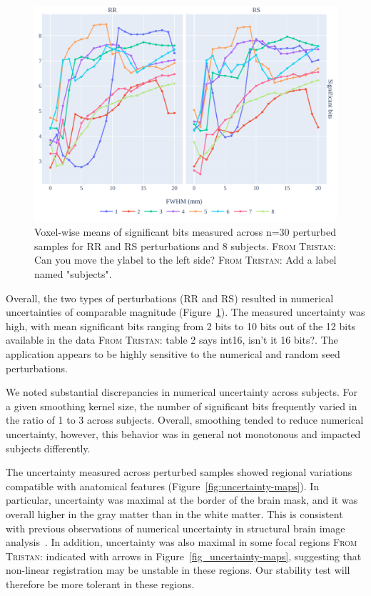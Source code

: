 \documentclass[lettersize,journal]{IEEEtran}
\newcommand{\TG}[1]{\color{blue}\textsc{From Tristan:} #1\color{black}\xspace}
\begin{document}
\begin{figure}
    \centering
    \includegraphics[width=\linewidth]{figures/stats.pdf}
    \caption{Voxel-wise means of significant bits
        measured across n=30 perturbed samples for RR and RS perturbations and 8
        subjects. \TG{Can you move the ylabel to the left side?} \TG{Add a label named "subjects".}}
    \label{fig:significant-digits}
\end{figure}
Overall, the two types of perturbations (RR and RS) resulted in numerical uncertainties of comparable magnitude (Figure~\ref{fig:significant-digits}). The measured uncertainty was high, with mean significant bits ranging from 2 bits to 10 bits out of the 12 bits available in the data \TG{table 2 says int16, isn't it 16 bits?}. The application appears to be highly sensitive to the numerical and random seed perturbations.

We noted substantial discrepancies in numerical uncertainty across subjects. For a given smoothing kernel size, the number of significant bits frequently varied in the ratio of 1 to 3 across subjects. Overall, smoothing tended to reduce numerical uncertainty, however, this behavior was in general not monotonous and impacted subjects differently.

The uncertainty measured across perturbed samples showed regional variations compatible with anatomical features (Figure~\ref{fig:uncertainty-maps}). In particular, uncertainty was
maximal at the border of the brain mask, and it was overall higher in the gray matter than in the white matter.
This is consistent with previous observations of numerical uncertainty in structural brain image analysis~\cite{salari2021accurate}.
In addition, uncertainty was also maximal in some focal regions \TG{indicated with arrows in Figure~\ref{fig_uncertainty-maps}}, suggesting that non-linear registration may be unstable in these regions. Our stability test will therefore be more tolerant in these regions.
\end{document}

